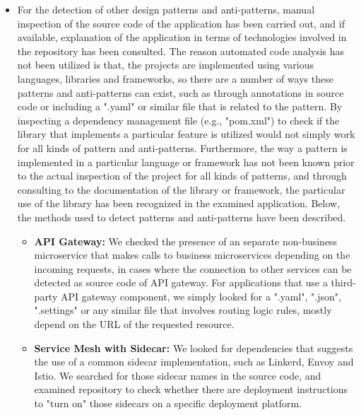 \documentclass{Configuration_Files/PoliMi3i_thesis}
\begin{document}
\begin{itemize}
    \item For the detection of other design patterns and anti-patterns, manual inspection of the source code of the application has been carried out, and if available, explanation of the application in terms of technologies involved in the repository has been consulted.
    The reason automated code analysis has not been utilized is that, the projects are implemented using various languages, libraries and frameworks, so there are a number of ways these patterns and anti-patterns can exist, such as through annotations in source code or including a ".yaml" or similar file that is related to the pattern.
    By inspecting a dependency management file (e.g., "pom.xml") to check if the library that implements a particular feature is utilized would not simply work for all kinds of pattern and anti-patterns.
    Furthermore, the way a pattern is implemented in a particular language or framework has not been known prior to the actual inspection of the project for all kinds of patterns, and through consulting to the documentation of the library or framework, the particular use of the library has been recognized in the examined application.
    Below, the methods used to detect patterns and anti-patterns have been described.
    
    \begin{itemize}
        \item \textbf{API Gateway:} We checked the presence of an separate non-business microservice that makes calls to business microservices depending on the incoming requests, in cases where the connection to other services can be detected as source code of API gateway.
        For applications that use a third-party API gateway component, we simply looked for a ".yaml", ".json", ".settings" or any similar file that involves routing logic rules, mostly depend on the URL of the requested resource.
        
        \item \textbf{Service Mesh with Sidecar:} We looked for dependencies that suggests the use of a common sidecar implementation, such as Linkerd, Envoy and Istio.
        We searched for those sidecar names in the source code, and examined repository to check whether there are deployment instructions to "turn on" those sidecars on a specific deployment platform.
        

\end{itemize}
\end{itemize}
\end{document}
